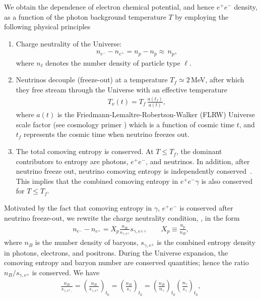 We obtain the dependence of electron chemical potential, and hence $e^+e^-$ density, as a function of the photon background temperature $T$ by employing the following physical principles
\begin{enumerate}
\item Charge neutrality of the Universe:
\begin{align}\label{neutrality}
n_{e^-}-n_{{e^+}}=n_p-n_{\overline{p}}\approx\,n_p,
\end{align}
where $n_\ell$ denotes the number density of particle type $\ell$.
\item Neutrinos decouple (freeze-out) at a temperature $T_f\simeq 2$\,MeV, after which they free stream through the Universe with an effective temperature~\cite{Birrell:2012gg}
\begin{align}
 T_\nu(t)=T_f\,\frac{a(t_f)}{a(t)},
\end{align}
where $a(t)$ is the Friedmann-Lema\^{i}tre-Robertson-Walker (FLRW) Universe scale factor (see cosmology primer ) which is a function of cosmic time $t$, and $t_f$ represents the cosmic time when neutrino freezes out.
\item The total comoving entropy is conserved. At $T\leq T_f$, the dominant contributors to entropy are photons, $e^+e^-$, and neutrinos. In addition, after neutrino freeze out, neutrino comoving entropy is independently conserved~\cite{Birrell:2012gg}. This implies that the combined comoving entropy in $e^+e^-\gamma$ is also conserved for $T\leq T_f$.
\end{enumerate} 
Motivated by the fact that comoving entropy in $\gamma$, $e^+e^-$ is conserved after neutrino freeze-out, we rewrite the charge neutrality condition, , in the form
\begin{align}\label{charge_neutral_cond2}
n_{e^-}-n_{{e^+}}=X_p\frac{n_B}{s_{\gamma,e^\pm}} s_{\gamma,e^\pm},\qquad X_p\equiv\frac{n_p}{n_B},
\end{align}
where $n_B$ is the number density of baryons, $s_{\gamma,e^\pm}$ is the combined entropy density in photons, electrons, and positrons. During the Universe expansion, the comoving entropy and baryon number are conserved quantities; hence the ratio $n_B/s_{\gamma,e^\pm}$ is conserved. We have
\begin{align}
\frac{n_B}{s_{\gamma,e^\pm,}}=\left(\frac{n_B}{s_{\gamma,e^\pm}}\right)_{t_0}\!\!\!\!=\left(\frac{n_B}{s_{\gamma}}\right)_{t_0}\!\!\!\!=\left(\frac{n_B}{n_\gamma}\right)_{t_0}\left(\frac{n_\gamma}{s_{\gamma}}\right)_{t_0},
\end{align}
